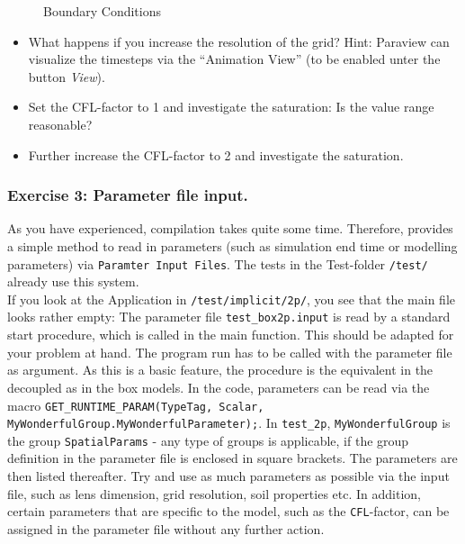 \begin{figure}[ht]
\centering
{}
\caption{Boundary Conditions}\label{tutorial-decoupled:ex2_BC}
\end{figure}

\begin{itemize}
 \item What happens if you increase the resolution of the grid? Hint: Paraview can visualize the timesteps via the ``Animation View'' (to be enabled unter the button \textit{View}).
 \item Set the CFL-factor to 1 and investigate the saturation: Is the value range reasonable?
 \item Further increase the CFL-factor to 2 and investigate the saturation.
\end{itemize}

\subsubsection{Exercise 3: Parameter file input.}
As you have experienced, compilation takes quite some time. Therefore, \Dumux provides a simple method to read in parameters (such as simulation end time or modelling parameters) via \texttt{Paramter Input Files}. The tests in the Test-folder \texttt{/test/} already use this system.\\
If you look at the Application in \texttt{/test/implicit/2p/}, you see that the main file looks rather empty: The parameter file \texttt{test\_box2p.input} is read by a standard start procedure, which is called in the main function. This should be adapted for your problem at hand. The program run has to be called with the parameter file as argument. As this is a basic \Dumux feature, the procedure is the equivalent in the decoupled as in the box models.
In the code, parameters can be read via the macro \texttt{GET\_RUNTIME\_PARAM(TypeTag, Scalar, MyWonderfulGroup.MyWonderfulParameter);}. In \texttt{test\_2p}, \texttt{MyWonderfulGroup} is the group \texttt{SpatialParams} - any type of groups is applicable, if the group definition in the parameter file is enclosed in square brackets. The parameters are then listed thereafter. Try and use as much parameters as possible via the input file, such as lens dimension, grid resolution, soil properties etc. In addition, certain parameters that are specific to the model, such as the \texttt{CFL}-factor, can be assigned in the parameter file without any further action.

